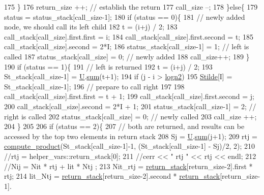 \begin{DoxyCode}
175       \}
176       return\_size ++; \textcolor{comment}{// establish the return}
177       call\_size --;
178     \}\textcolor{keywordflow}{else}\{
179       status = status\_stack[call\_size-1];
180       \textcolor{keywordflow}{if} (status == 0)\{
181         \textcolor{comment}{// newly added node, we should call its left child}
182         t = (i+j) / 2;
183         call\_stack[call\_size].first.first = i;
184         call\_stack[call\_size].first.second = t;
185         call\_stack[call\_size].second = 2*I;
186         status\_stack[call\_size-1] = 1; \textcolor{comment}{// left is called}
187         status\_stack[call\_size] = 0; \textcolor{comment}{// newly added}
188         call\_size++;
189       \}
190       \textcolor{keywordflow}{if} (status == 1)\{
191         \textcolor{comment}{// left is returned}
192         t = (i+j) / 2;
193         St\_stack[call\_size-1] = \hyperlink{classgraph__encoder_a3314c40920f2ee132958a6b0ce7e7995}{U}.\hyperlink{classreverse__fenwick__tree_a672731fd6395b4853430073a099a80e6}{sum}(t+1);
194         \textcolor{keywordflow}{if} (j - i > \hyperlink{classgraph__encoder_a27fde3a95a280304877b1e37fc4d8553}{logn2})
195           \hyperlink{classgraph__encoder_a342688a3fdee511b7fae3f155cfb10cf}{Stilde}[I] = St\_stack[call\_size-1];
196         \textcolor{comment}{// prepare to call right}
197         
198         call\_stack[call\_size].first.first = t + 1;
199         call\_stack[call\_size].first.second = j;
200         call\_stack[call\_size].second = 2*I + 1;
201         status\_stack[call\_size-1] = 2; \textcolor{comment}{// right is called}
202         status\_stack[call\_size] = 0; \textcolor{comment}{// newly called}
203         call\_size ++;
204       \}
205 
206       \textcolor{keywordflow}{if} (status == 2)\{
207         \textcolor{comment}{// both are returned, and results can be accessed by the top two elements in return stack}
208         Sj = \hyperlink{classgraph__encoder_a3314c40920f2ee132958a6b0ce7e7995}{U}.\hyperlink{classreverse__fenwick__tree_a672731fd6395b4853430073a099a80e6}{sum}(j+1);
209         rtj = \hyperlink{compression__helper_8cpp_ae2afb43aabe50f7d42aae8f82b5a35f4}{compute\_product}(St\_stack[call\_size-1]-1, (St\_stack[call\_size-1] - Sj)/2, 2);
210         \textcolor{comment}{//rtj = helper\_vars::return\_stack[0];}
211         \textcolor{comment}{//cerr << " rtj " << rtj << endl;}
212         \textcolor{comment}{//Nij = Nit * rtj + lit * Ntj ;}
213         Nit\_rtj = \hyperlink{namespacehelper__vars_a36577c81e805c58ec2ec7ed63882317f}{return\_stack}[return\_size-2].first * rtj;
214         lit\_Ntj = \hyperlink{namespacehelper__vars_a36577c81e805c58ec2ec7ed63882317f}{return\_stack}[return\_size-2].second * \hyperlink{namespacehelper__vars_a36577c81e805c58ec2ec7ed63882317f}{return\_stack}[return\_size-1].

\end{DoxyCode}
